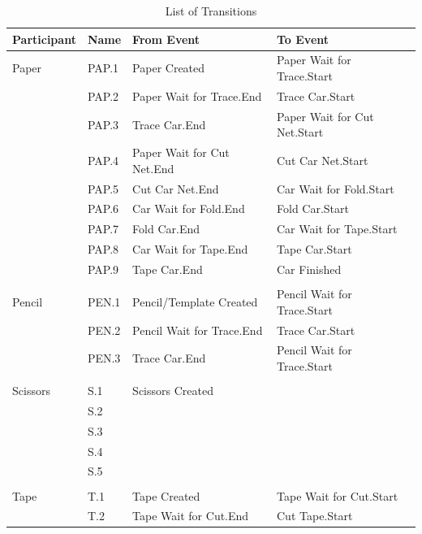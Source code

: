 \documentclass[
  10pt,
  a4paperpaper,
  DIV=11,
  numbers=noendperiod,
  oneside]{scrreprt}
\begin{document}
\begin{longtable}{p{2.4cm}>{\raggedright\arraybackslash}p{1.2cm}>{\raggedright\arraybackslash}p{5.9cm}>{\raggedright\arraybackslash}p{5.9cm}}

\caption{\label{tbl-transitions_pc}List of Transitions}

\tabularnewline

\toprule
Participant & Name & From Event & To Event       \\ \midrule
\endhead
Paper & PAP.1 & Paper Created & Paper Wait for Trace.Start \\
      & PAP.2 & Paper Wait for Trace.End & Trace Car.Start \\
      & PAP.3 & Trace Car.End & Paper Wait for Cut Net.Start \\
      & PAP.4 & Paper Wait for Cut Net.End & Cut Car Net.Start \\
      & PAP.5 & Cut Car Net.End & Car Wait for Fold.Start \\
      & PAP.6 & Car Wait for Fold.End & Fold Car.Start \\
      & PAP.7 & Fold Car.End & Car Wait for Tape.Start \\
      & PAP.8 & Car Wait for Tape.End & Tape Car.Start \\
      & PAP.9 & Tape Car.End & Car Finished \\
      &      &              &              \\
Pencil & PEN.1 & Pencil/Template Created & Pencil Wait for Trace.Start \\
       & PEN.2 & Pencil Wait for Trace.End & Trace Car.Start \\
       & PEN.3 & Trace Car.End & Pencil Wait for Trace.Start \\
       &      &              &              \\
Scissors & S.1 & Scissors Created             &              \\
       & S.2   &              &              \\
       & S.3   &              &              \\
       & S.4   &              &              \\
       & S.5   &              &              \\
       &      &              &              \\
Tape   & T.1 & Tape Created & Tape Wait for Cut.Start \\
       & T.2 & Tape Wait for Cut.End & Cut Tape.Start \\

\end{longtable}
\end{document}
